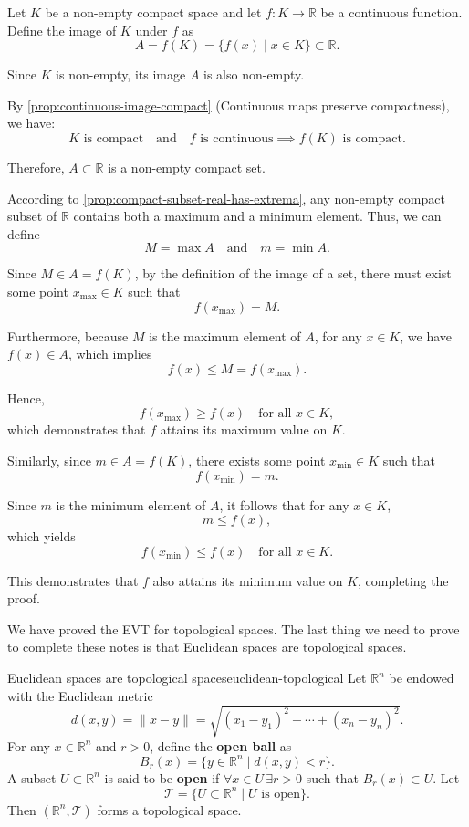 \documentclass[UTF8,12pt,a4paper]{ctexart}
\makeatletter
\numberwithin{equation}{section}
\newcommand{\currentProofColor}{black}
\renewenvironment{proof}[1][Proof]{%
  \par
  \begingroup
  \edef\proofQEDColor{\currentProofColor}%
  \renewcommand{\qedsymbol}{\textcolor{\proofQEDColor}{$\blacksquare$}}%
  \pushQED{\qed}%
  \normalfont
  \topsep6\p@\@plus6\p@\relax
  \trivlist
  \item[\hskip\labelsep\bfseries\itshape #1\@addpunct{.}]\ignorespaces
}{%
  \popQED
  \endtrivlist
  \@endpefalse
  \endgroup
}
\makeatother
\begin{document}
\begin{proof}
Let $K$ be a non-empty compact space and let $f: K \to \mathbb{R}$ be a continuous function. Define the image of $K$ under $f$ as
$$
A = f(K) = \{f(x) \mid x \in K\} \subset \mathbb{R}.
$$

Since $K$ is non-empty, its image $A$ is also non-empty. 

By \ref{prop:continuous-image-compact} (Continuous maps preserve compactness), we have:
$$
K \text{ is compact} \quad \text{and} \quad f \text{ is continuous} \implies f(K) \text{ is compact}.
$$

Therefore, $A \subset \mathbb{R}$ is a non-empty compact set. 

According to \ref{prop:compact-subset-real-has-extrema}, any non-empty compact subset of $\mathbb{R}$ contains both a maximum and a minimum element. Thus, we can define
$$
M = \max A \quad \text{and} \quad m = \min A.
$$

Since $M \in A = f(K)$, by the definition of the image of a set, there must exist some point $x_{\max} \in K$ such that
$$
f(x_{\max}) = M.
$$

Furthermore, because $M$ is the maximum element of $A$, for any $x \in K$, we have $f(x) \in A$, which implies
$$
f(x) \le M = f(x_{\max}).
$$

Hence,
$$
f(x_{\max}) \ge f(x) \quad \text{for all } x \in K,
$$
which demonstrates that $f$ attains its maximum value on $K$.

Similarly, since $m \in A = f(K)$, there exists some point $x_{\min} \in K$ such that
$$
f(x_{\min}) = m.
$$

Since $m$ is the minimum element of $A$, it follows that for any $x \in K$,
$$
m \le f(x),
$$
which yields
$$
f(x_{\min}) \le f(x) \quad \text{for all } x \in K.
$$

This demonstrates that $f$ also attains its minimum value on $K$, completing the proof.
\end{proof}

We have proved the EVT for topological spaces. The last thing we need to prove to complete these notes is that Euclidean spaces are topological spaces.

\begin{lem}{Euclidean spaces are topological spaces}{euclidean-topological}
Let $\mathbb{R}^n$ be endowed with the Euclidean metric 
$$
d(x,y) = \|x-y\| = \sqrt{(x_1-y_1)^2 + \cdots + (x_n-y_n)^2}.
$$
For any $x \in \mathbb{R}^n$ and $r > 0$, define the \textbf{open ball} as
$$
B_r(x) = \{y \in \mathbb{R}^n \mid d(x,y) < r\}.
$$
A subset $U \subset \mathbb{R}^n$ is said to be \textbf{open} if $\forall x \in U \, \exists r>0$ such that $B_r(x) \subset U$. Let
$$
\mathcal{T} = \{U \subset \mathbb{R}^n \mid U \text{ is open}\}.
$$
Then $(\mathbb{R}^n, \mathcal{T})$ forms a topological space.
\end{lem}
\end{document}
